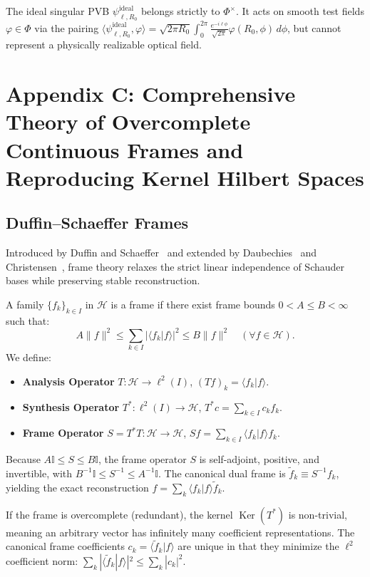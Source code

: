 \documentclass{optica-article}
\begin{document}
The ideal singular PVB $\psi_{\ell, R_0}^{\text{ideal}}$ belongs strictly to $\Phi^\times$. It acts on smooth test fields $\varphi \in \Phi$ via the pairing $\langle \psi_{\ell, R_0}^{\text{ideal}}, \varphi \rangle = \sqrt{2\pi R_0} \int_0^{2\pi} \frac{e^{-i \ell \phi}}{\sqrt{2\pi}} \varphi(R_0, \phi) \, d\phi$, but cannot represent a physically realizable optical field.

\section{Appendix C: Comprehensive Theory of Overcomplete Continuous Frames and Reproducing Kernel Hilbert Spaces}
\label{app:frames}

\subsection{Duffin--Schaeffer Frames}

Introduced by Duffin and Schaeffer~\cite{Duffin1952} and extended by Daubechies~\cite{Daubechies1990} and Christensen~\cite{Christensen2016}, frame theory relaxes the strict linear independence of Schauder bases while preserving stable reconstruction.

A family $\{f_k\}_{k \in I}$ in $\mathcal{H}$ is a frame if there exist frame bounds $0 < A \le B < \infty$ such that:
\begin{equation}
A \|f\|^2 \le \sum_{k \in I} |\langle f_k | f \rangle|^2 \le B \|f\|^2 \quad (\forall f \in \mathcal{H}).
\label{eq:app_discrete_frame}
\end{equation}
We define:
\begin{itemize}
    \item \textbf{Analysis Operator} $T: \mathcal{H} \to \ell^2(I)$, $(T f)_k = \langle f_k | f \rangle$.
    \item \textbf{Synthesis Operator} $T^*: \ell^2(I) \to \mathcal{H}$, $T^* c = \sum_{k \in I} c_k f_k$.
    \item \textbf{Frame Operator} $S = T^* T: \mathcal{H} \to \mathcal{H}$, $S f = \sum_{k \in I} \langle f_k | f \rangle f_k$.
\end{itemize}
Because $A \mathbb{I} \le S \le B \mathbb{I}$, the frame operator $S$ is self-adjoint, positive, and invertible, with $B^{-1} \mathbb{I} \le S^{-1} \le A^{-1} \mathbb{I}$. The canonical dual frame is $\widetilde{f}_k \equiv S^{-1} f_k$, yielding the exact reconstruction $f = \sum_k \langle f_k | f \rangle \widetilde{f}_k$.

If the frame is overcomplete (redundant), the kernel $\operatorname{Ker}(T^*)$ is non-trivial, meaning an arbitrary vector has infinitely many coefficient representations. The canonical frame coefficients $c_k = \langle \widetilde{f}_k | f \rangle$ are unique in that they minimize the $\ell^2$ coefficient norm: $\sum_k |\langle \widetilde{f}_k | f \rangle|^2 \le \sum_k |c_k|^2$.
\end{document}

